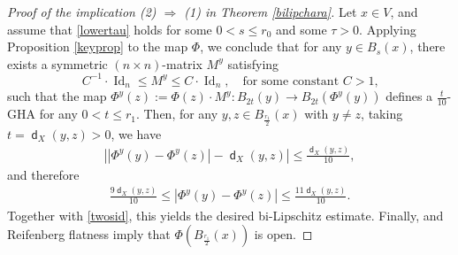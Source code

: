 \documentclass[11pt,reqno]{amsart}
\theoremstyle{definition}
\numberwithin{equation}{section}
\DeclareMathOperator{\dist}{\mathsf{d}}
\DeclareMathOperator{\Id}{Id}
\begin{document}
\begin{proof}[Proof of the implication (2) $\Rightarrow$ (1) in Theorem \ref{bilipchara}]

Let $x \in V$, and assume that  \eqref{lowertau} holds for some $0< s \le r_0$  and some $\tau>0$. 
Applying Proposition \ref{keyprop} to the map $\Phi$, we conclude that for any $y \in B_{s}(x)$, there exists a symmetric $(n \times n)$-matrix $M^y$ satisfying
    \begin{equation}\label{twosid}
C^{-1} \cdot \Id_n \le M^y \le C \cdot \Id_n, \quad \text{for some  constant $C>1$,}
\end{equation}
 such that the map 
$
    \Phi^y(z) := \Phi(z) \cdot M^y: B_{2t}(y)  \to  B_{2t}(\Phi^y(y))$ defines a $\frac{t}{10}$-GHA for any $0<t \le r_1$.
Then, for any $y, z \in B_{\frac{r_1}{2}}(x)$ with $y \neq z$, taking $t=\dist_X(y, z)>0$, we have
\begin{align}
\left| \left|\Phi^y(y)-\Phi^y(z) \right|-\dist_X(y, z)\right|\le  \frac{\dist_X(y, z)}{10},\end{align}
and therefore \begin{align}
   \frac{9\dist_X(y,z)}{10} \le \left|\Phi^y(y)-\Phi^y(z) \right| \le \frac{11\dist_X(y, z)}{10}.
\end{align}
Together with \eqref{twosid}, this yields the desired bi-Lipschitz estimate. Finally, \cite[Theorem 2.9 and Remark 2.10]{KM} and  Reifenberg flatness imply that $\Phi(B_{\frac{r_1}{2}}(x))$ is open.
\end{proof}
\end{document}
